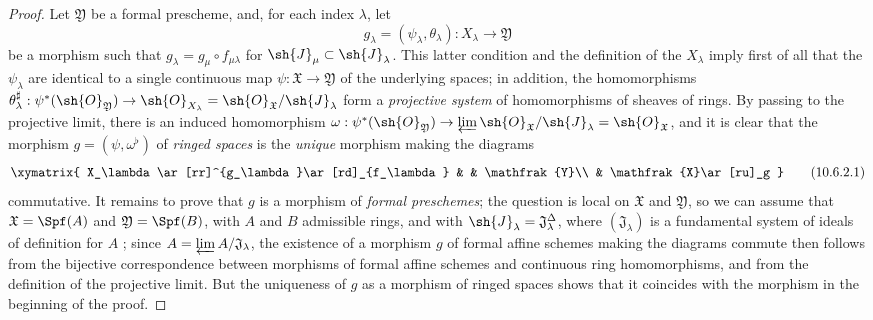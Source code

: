 \begin{proof}
Let $\mathfrak{Y}$ be a formal prescheme, and, for each index $\lambda$, let
\[
  g_\lambda=(\psi_\lambda,\theta_\lambda):X_\lambda\to\mathfrak{Y}
\]
be a morphism such that $g_\lambda=g_\mu\circ f_{\mu\lambda}$ for $\sh{J}_\mu\subset\sh{J}_\lambda$.
This latter condition and the definition of the $X_\lambda$ imply first of all that the $\psi_\lambda$ are identical to a single continuous map $\psi:\mathfrak{X}\to\mathfrak{Y}$ of the underlying spaces; in addition, the homomorphisms $\theta_\lambda^\sharp:\psi^*(\sh{O}_\mathfrak{Y})\to\sh{O}_{X_\lambda}=\sh{O}_\mathfrak{X}/\sh{J}_\lambda$ form a \emph{projective system} of homomorphisms of sheaves of rings.
By passing to the projective limit, there is an induced homomorphism $\omega:\psi^*(\sh{O}_\mathfrak{Y})\to\varprojlim\sh{O}_\mathfrak{X}/\sh{J}_\lambda=\sh{O}_\mathfrak{X}$, and it is clear that the morphism $g=(\psi,\omega^\flat)$ of \emph{ringed spaces} is the \emph{unique} morphism making the diagrams
\[
\label{I.10.6.2.1}
  \xymatrix{
    X_\lambda\ar[rr]^{g_\lambda}\ar[rd]_{f_\lambda} & &
    \mathfrak{Y}\\
    & \mathfrak{X}\ar[ru]_g
  }
  \tag{10.6.2.1}
\]
commutative.
It remains to prove that $g$ is a morphism of \emph{formal preschemes}; the question is local on $\mathfrak{X}$ and $\mathfrak{Y}$, so we can assume that $\mathfrak{X}=\Spf(A)$ and $\mathfrak{Y}=\Spf(B)$, with $A$ and $B$ admissible rings, and with $\sh{J}_\lambda=\mathfrak{J}_\lambda^\Delta$, where $(\mathfrak{J}_\lambda)$ is a fundamental system of ideals of definition for $A$ ; since $A=\varprojlim A/\mathfrak{J}_\lambda$, the existence of a morphism $g$ of formal affine schemes making the diagrams  commute then follows from the bijective correspondence  between morphisms of formal affine schemes and continuous ring homomorphisms, and from the definition of the projective limit.
But the uniqueness of $g$ as a morphism of ringed spaces shows that it coincides with the morphism in the beginning of the proof.
\end{proof}

